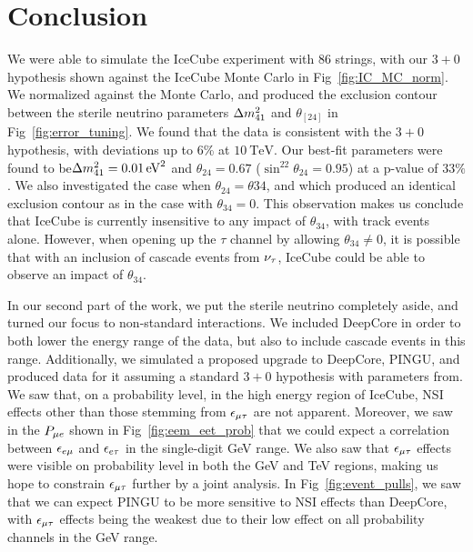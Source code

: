 \chapter{Conclusion}\label{ch:conc}
We were able to simulate the IceCube experiment with 86 strings, with our $3+0$ hypothesis shown against the IceCube Monte Carlo in Fig~\ref{fig:IC_MC_norm}. 
We normalized against the Monte Carlo, and produced the exclusion contour between the sterile neutrino parameters $\dm[41]$ and $\theta_[24]$ in Fig~\ref{fig:error_tuning}.
We found that the data is consistent with the $3+0$ hypothesis, with deviations up to 6\% at $\SI{10}{\TeV}$.
Our best-fit parameters were found to be$\dm[41] = \SI{0.01}{\eV^2}$ and $\theta_{24} = 0.67$ ($\sin^22\theta_{24} = 0.95$) at 
a p-value of $33\%$.
We also investigated the case when $\theta_{24} = \theta{34}$, and which produced an identical exclusion contour as in the case with $\theta_{34}=0$. This 
observation makes us conclude that IceCube is currently insensitive to any impact of $\theta_{34}$, with track events alone. However,
when opening up the $\tau$ channel by allowing $\theta_{34} \neq 0$, it is possible that with an inclusion of cascade events from $\nu_\tau$, IceCube could be able to observe 
an impact of $\theta_{34}$.

In our second part of the work, we put the sterile neutrino completely aside, and turned our focus to non-standard interactions. 
We included DeepCore in order to both lower the energy range of the data, but also to include cascade events in this range. 
Additionally, we simulated a proposed upgrade to DeepCore, PINGU, and produced data for it assuming a standard $3+0$ hypothesis with parameters from\cite{nufit}.
We saw that, on a probability level, in the high energy region of IceCube, NSI effects other than those stemming from $\epsilon_{\mu\tau}$ are not apparent.
Moreover, we saw in the $P_{\mu e}$ shown in Fig~\ref{fig:eem_eet_prob} that we could expect a correlation between $\epsilon_{e\mu}$ and $\epsilon_{e\tau}$ in the single-digit \si{\GeV} range.
We also saw that $\epsilon_{\mu\tau}$ effects were visible on probability level in both the \si{\GeV} and \si{\TeV} regions, making us hope to constrain $\epsilon_{\mu\tau}$ further by 
a joint analysis.
In Fig~\ref{fig:event_pulls}, we saw that we can expect PINGU to be more sensitive to NSI effects than DeepCore, with $\epsilon_{\mu\tau}$ effects being the weakest 
due to their low effect on all probability channels in the \si{\GeV} range.

